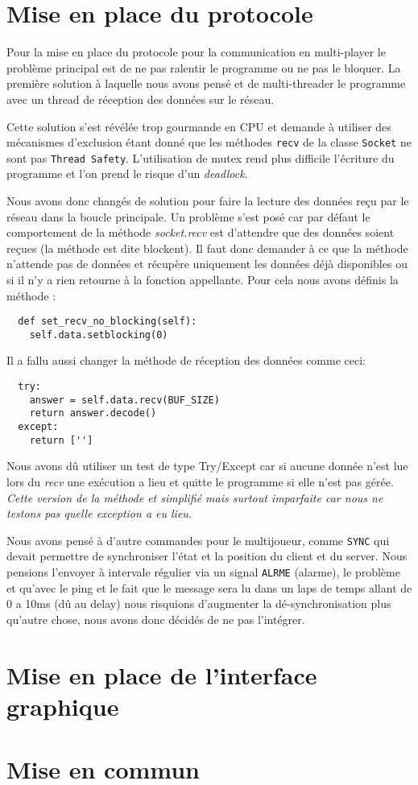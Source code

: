 \documentclass[12pt]{report}
\begin{document}
\chapter{Mise en place du protocole}
Pour la mise en place du protocole pour la communication en multi-player le
problème principal est de ne pas ralentir le programme ou ne pas le bloquer.
La première solution à laquelle nous avons pensé et de multi-threader le
programme avec un thread de réception des données sur le réseau.

Cette solution s'est révélée trop gourmande en CPU et demande à utiliser des
mécanismes d'exclusion étant donné que les méthodes \texttt{recv} de la classe
\texttt{Socket} ne sont pas \texttt{Thread Safety}.
L'utilisation de mutex rend plus difficile l'écriture du programme et l'on
prend le risque d'un \textit{deadlock}.

Nous avons donc changés de solution pour faire la lecture des données reçu
par le réseau dans la boucle principale.
Un problème s'est posé car par défaut le comportement de la
méthode \textit{socket.recv} est d'attendre que des données soient reçues (la
méthode est dite blockent). Il faut donc demander à ce que la méthode
n'attende pas de données et récupère uniquement les données déjà
disponibles ou si il n'y a rien retourne à la fonction appellante.
Pour cela nous avons définis la méthode :
\begin{verbatim}
  def set_recv_no_blocking(self):
    self.data.setblocking(0)
\end{verbatim}

Il a fallu aussi changer la méthode de réception des données comme ceci:
\begin{verbatim}
  try:
    answer = self.data.recv(BUF_SIZE)
    return answer.decode()
  except:
    return ['']
\end{verbatim}

Nous avons dû utiliser un test de type Try/Except car si aucune donnée n'est lue
lors du \textit{recv} une exécution a lieu et quitte le programme si elle
n'est pas gérée.
\textit{Cette version de la méthode et simplifié mais surtout imparfaite
  car nous ne testons pas quelle exception a eu lieu.}

Nous avons pensé à d'autre commandes pour le multijoueur, comme \texttt{SYNC} qui
devait permettre de synchroniser l'état et la position du client et du server.
Nous pensions l'envoyer à intervale régulier via un signal \texttt{ALRME} (alarme),
le problème et qu'avec le ping et le fait que le message sera lu dans un laps
de temps allant de 0 a 10ms (dû au delay) nous risquions d'augmenter la
dé-synchronisation plus qu'autre chose, nous avons donc décidés de ne
pas l'intégrer.

\chapter{Mise en place de l'interface graphique}

\chapter{Mise en commun}
\end{document}
